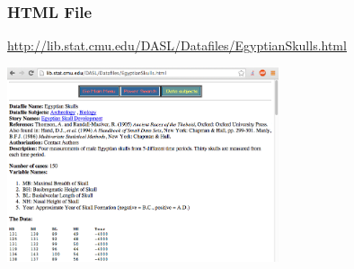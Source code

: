 \documentclass{beamer}\usepackage[]{graphicx}\usepackage[]{color}
\begin{document}

\begin{frame}
\frametitle{HTML File}

{\footnotesize \url{http://lib.stat.cmu.edu/DASL/Datafiles/EgyptianSkulls.html}}

\begin{center}
\includegraphics[width=8cm]{images/skulls_data.png}
\end{center}

\end{frame}

\end{document}
